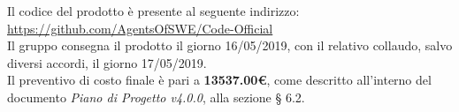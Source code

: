 \documentclass[11pt, a4paper]{letter} %
\begin{document}
\begin{letter}
\begin{itemize}
		\end{itemize}
		Il codice del prodotto è presente al seguente indirizzo: \url{https://github.com/AgentsOfSWE/Code-Official}\\
		Il gruppo consegna il prodotto il giorno 16/05/2019, con il relativo collaudo, salvo diversi accordi, il giorno 17/05/2019.\\  
		Il preventivo di costo finale è pari a \textbf{13537.00€}, come descritto all'interno del documento \textit{Piano di Progetto v4.0.0}, alla sezione § 6.2.\\ %

\end{letter}
\end{document}
